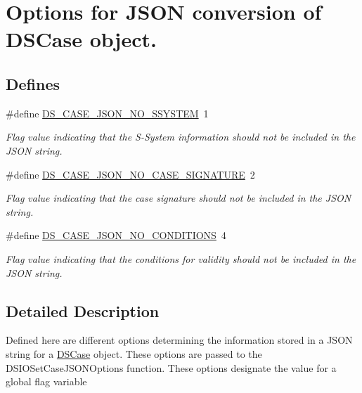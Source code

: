 \hypertarget{group___d_s___c_a_s_e___j_s_o_n___o_p_t_i_o_n_s}{
\section{Options for JSON conversion of DSCase object.}
\label{group___d_s___c_a_s_e___j_s_o_n___o_p_t_i_o_n_s}
}
\subsection*{Defines}
\begin{DoxyCompactItemize}
\item 
\hypertarget{group___d_s___c_a_s_e___j_s_o_n___o_p_t_i_o_n_s_gae22b11d61deb34f2a04597b5b52e0186}{
\#define \hyperlink{group___d_s___c_a_s_e___j_s_o_n___o_p_t_i_o_n_s_gae22b11d61deb34f2a04597b5b52e0186}{DS\_\-CASE\_\-JSON\_\-NO\_\-SSYSTEM}~1}
\label{group___d_s___c_a_s_e___j_s_o_n___o_p_t_i_o_n_s_gae22b11d61deb34f2a04597b5b52e0186}

\begin{DoxyCompactList}\small\item\em Flag value indicating that the S-\/System information should not be included in the JSON string. \item\end{DoxyCompactList}\item 
\hypertarget{group___d_s___c_a_s_e___j_s_o_n___o_p_t_i_o_n_s_gaae3a87d36892fd5744ebe4ad8b111ddf}{
\#define \hyperlink{group___d_s___c_a_s_e___j_s_o_n___o_p_t_i_o_n_s_gaae3a87d36892fd5744ebe4ad8b111ddf}{DS\_\-CASE\_\-JSON\_\-NO\_\-CASE\_\-SIGNATURE}~2}
\label{group___d_s___c_a_s_e___j_s_o_n___o_p_t_i_o_n_s_gaae3a87d36892fd5744ebe4ad8b111ddf}

\begin{DoxyCompactList}\small\item\em Flag value indicating that the case signature should not be included in the JSON string. \item\end{DoxyCompactList}\item 
\hypertarget{group___d_s___c_a_s_e___j_s_o_n___o_p_t_i_o_n_s_ga43b67d5fc5384d7f11297fa0dab16a72}{
\#define \hyperlink{group___d_s___c_a_s_e___j_s_o_n___o_p_t_i_o_n_s_ga43b67d5fc5384d7f11297fa0dab16a72}{DS\_\-CASE\_\-JSON\_\-NO\_\-CONDITIONS}~4}
\label{group___d_s___c_a_s_e___j_s_o_n___o_p_t_i_o_n_s_ga43b67d5fc5384d7f11297fa0dab16a72}

\begin{DoxyCompactList}\small\item\em Flag value indicating that the conditions for validity should not be included in the JSON string. \item\end{DoxyCompactList}\end{DoxyCompactItemize}


\subsection{Detailed Description}
Defined here are different options determining the information stored in a JSON string for a \hyperlink{struct_d_s_case}{DSCase} object. These options are passed to the DSIOSetCaseJSONOptions function. These options designate the value for a global flag variable 